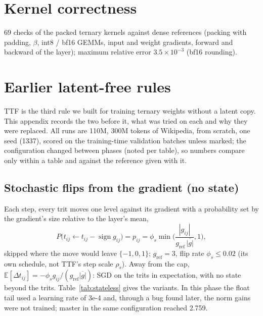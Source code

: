 \documentclass[10pt,twocolumn]{article}
\newcommand{\sign}{\operatorname{sign}}
\begin{document}
\section{Kernel correctness}
69 checks of the packed ternary kernels against dense references (packing with padding, $\beta$, int8 / bf16 GEMMs,
input and weight gradients, forward and backward of the layer); maximum relative error $3.5\times10^{-3}$ (bf16
rounding).

\section{Earlier latent-free rules}\label{app:history}
TTF is the third rule we built for training ternary weights without a latent copy. This appendix records the two before
it, what was tried on each and why they were replaced. All runs are 110M, 300M tokens of Wikipedia, from scratch, one
seed (1337), scored on the training-time validation batches unless marked; the configuration changed between phases (noted
per table), so numbers compare only within a table and against the reference given with it.

\subsection{Stochastic flips from the gradient (no state)}\label{app:stateless}
Each step, every trit moves one level against its gradient with a probability set by the gradient's size relative to
the layer's mean,
\begin{equation}
  P\big(t_{ij}\leftarrow t_{ij}-\sign g_{ij}\big)=p_{ij}=\phi_s\min\!\Big(\frac{|g_{ij}|}{g_{\text{ref}}\,\overline{|g|}},1\Big),
\end{equation}
skipped where the move would leave $\{-1,0,1\}$; $g_{\text{ref}}=3$, flip rate $\phi_s\le0.02$
(its own schedule, not TTF's step scale $\rho_s$). Away from the cap,
$\mathbb E[\Delta t_{ij}]=-\phi_s g_{ij}/(g_{\text{ref}}\overline{|g|})$: SGD on the trits in expectation, with no state
beyond the trits. Table~\ref{tab:stateless} gives the variants. In this phase the float tail used a learning rate of
3e-4 and, through a bug found later, the norm gains were not trained; master in the same configuration reached 2.759.
\end{document}
